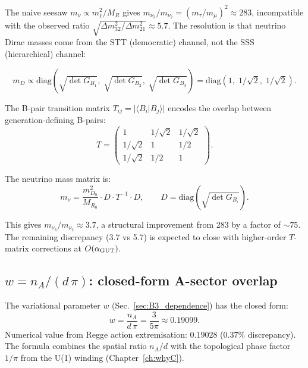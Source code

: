 The naive seesaw $m_\nu \propto m_\ell^2 / M_R$ gives $m_{\nu_3}/m_{\nu_2} = (m_\tau/m_\mu)^2 \approx 283$, incompatible with the observed ratio $\sqrt{\Delta m^2_{32}/\Delta m^2_{21}} \approx 5.7$.  The resolution is that neutrino Dirac masses come from the STT (democratic) channel, not the SSS (hierarchical) channel:

\begin{equation}
m_D \propto \text{diag}(\sqrt{\det G_{B_1}},\; \sqrt{\det G_{B_2}},\; \sqrt{\det G_{B_3}}) = \text{diag}(1,\; 1/\sqrt{2},\; 1/\sqrt{2}).
\end{equation}

The B-pair transition matrix $T_{ij} = |\langle B_i | B_j \rangle|$ encodes the overlap between generation-defining B-pairs:
\begin{equation}
T = \begin{pmatrix} 1 & 1/\sqrt{2} & 1/\sqrt{2} \\ 1/\sqrt{2} & 1 & 1/2 \\ 1/\sqrt{2} & 1/2 & 1 \end{pmatrix}.
\end{equation}

The neutrino mass matrix is:
\begin{equation}
m_\nu = \frac{m_{D_0}^2}{M_{R_0}} \cdot D \cdot T^{-1} \cdot D, \qquad D = \text{diag}(\sqrt{\det G_{B_i}}).
\end{equation}

This gives $m_{\nu_3}/m_{\nu_2} \approx 3.7$, a structural improvement from 283 by a factor of $\sim 75$.  The remaining discrepancy (3.7 vs 5.7) is expected to close with higher-order $T$-matrix corrections at $O(\alpha_{\mathrm{GUT}})$.

\subsection{$w = n_A/(d\,\pi)$: closed-form A-sector overlap}
\label{sec:w_closed}

The variational parameter $w$ (Sec.~\ref{sec:B3_dependence}) has the closed form:
\begin{equation}
\boxed{w = \frac{n_A}{d\,\pi} = \frac{3}{5\pi} \approx 0.19099.}
\end{equation}
Numerical value from Regge action extremisation: $0.19028$ ($0.37\%$ discrepancy).  The formula combines the spatial ratio $n_A/d$ with the topological phase factor $1/\pi$ from the U(1) winding (Chapter~\ref{ch:whyC}).

